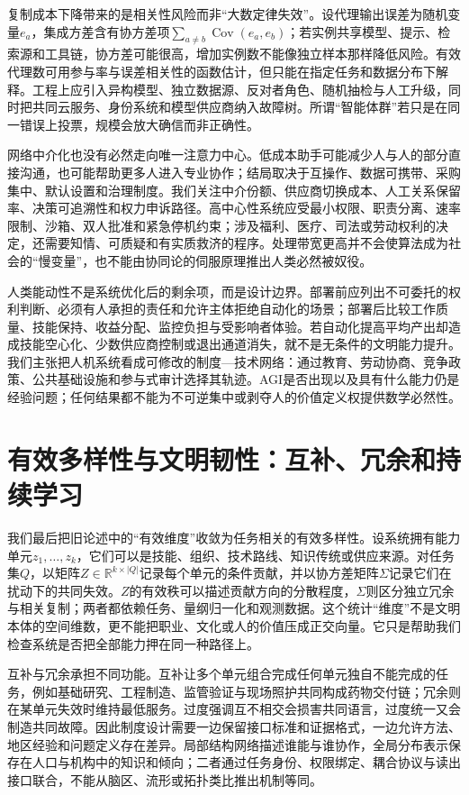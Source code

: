 复制成本下降带来的是相关性风险而非“大数定律失效”。设代理输出误差为随机变量$e_a$，集成方差含有协方差项$\sum_{a\ne b}\operatorname{Cov}(e_a,e_b)$；若实例共享模型、提示、检索源和工具链，协方差可能很高，增加实例数不能像独立样本那样降低风险。有效代理数可用参与率与误差相关性的函数估计，但只能在指定任务和数据分布下解释。工程上应引入异构模型、独立数据源、反对者角色、随机抽检与人工升级，同时把共同云服务、身份系统和模型供应商纳入故障树。所谓“智能体群”若只是在同一错误上投票，规模会放大确信而非正确性。

网络中介化也没有必然走向唯一注意力中心。低成本助手可能减少人与人的部分直接沟通，也可能帮助更多人进入专业协作；结局取决于互操作、数据可携带、采购集中、默认设置和治理制度。我们关注中介份额、供应商切换成本、人工关系保留率、决策可追溯性和权力申诉路径。高中心性系统应受最小权限、职责分离、速率限制、沙箱、双人批准和紧急停机约束；涉及福利、医疗、司法或劳动权利的决定，还需要知情、可质疑和有实质救济的程序。处理带宽更高并不会使算法成为社会的“慢变量”，也不能由协同论的伺服原理推出人类必然被奴役。

人类能动性不是系统优化后的剩余项，而是设计边界。部署前应列出不可委托的权利判断、必须有人承担的责任和允许主体拒绝自动化的场景；部署后比较工作质量、技能保持、收益分配、监控负担与受影响者体验。若自动化提高平均产出却造成技能空心化、少数供应商控制或退出通道消失，就不是无条件的文明能力提升。我们主张把人机系统看成可修改的制度—技术网络：通过教育、劳动协商、竞争政策、公共基础设施和参与式审计选择其轨迹。AGI是否出现以及具有什么能力仍是经验问题；任何结果都不能为不可逆集中或剥夺人的价值定义权提供数学必然性。

\section{有效多样性与文明韧性：互补、冗余和持续学习}
\label{sec:effective_dimension_civilization}

我们最后把旧论述中的“有效维度”收敛为任务相关的有效多样性。设系统拥有能力单元$z_1,\ldots,z_k$，它们可以是技能、组织、技术路线、知识传统或供应来源。对任务集$Q$，以矩阵$Z\in\mathbb{R}^{k\times |Q|}$记录每个单元的条件贡献，并以协方差矩阵$\Sigma$记录它们在扰动下的共同失效。$Z$的有效秩可以描述贡献方向的分散程度，$\Sigma$则区分独立冗余与相关复制；两者都依赖任务、量纲归一化和观测数据。这个统计“维度”不是文明本体的空间维数，更不能把职业、文化或人的价值压成正交向量。它只是帮助我们检查系统是否把全部能力押在同一种路径上。

互补与冗余承担不同功能。互补让多个单元组合完成任何单元独自不能完成的任务，例如基础研究、工程制造、监管验证与现场照护共同构成药物交付链；冗余则在某单元失效时维持最低服务。过度强调互不相交会损害共同语言，过度统一又会制造共同故障。因此制度设计需要一边保留接口标准和证据格式，一边允许方法、地区经验和问题定义存在差异。局部结构网络描述谁能与谁协作，全局分布表示保存在人口与机构中的知识和倾向；二者通过任务身份、权限绑定、耦合协议与读出接口联合，不能从脑区、流形或拓扑类比推出机制等同。

